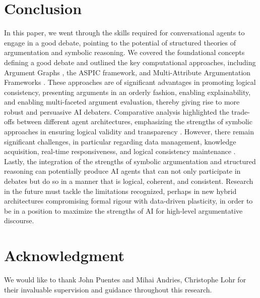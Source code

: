 \documentclass[conference]{IEEEtran}
\begin{document}
\section{Conclusion}
In this paper, we went through the skills required for conversational agents to engage in a good debate, pointing to the potential of structured theories of argumentation and symbolic reasoning. We covered the foundational concepts defining a good debate \cite{rakshit2019debbie} \cite{tan2016winning} \cite{b8} and outlined the key computational approaches, including Argument Graphs \cite{chalaguine2020persuasive}, the ASPIC framework, and Multi-Attribute Argumentation Frameworks \cite{engelmann2022argumentation}. These approaches are of significant advantages in promoting logical consistency, presenting arguments in an orderly fashion, enabling explainability, and enabling multi-faceted argument evaluation, thereby giving rise to more robust and persuasive AI debaters.
Comparative analysis highlighted the trade-offs between different agent architectures, emphasizing the strengths of symbolic approaches in ensuring logical validity and transparency \cite{b11}. However, there remain significant challenges, in particular regarding data management, knowledge acquisition, real-time responsiveness, and logical consistency maintenance \cite{b10} \cite{b11}.
Lastly, the integration of the strengths of symbolic argumentation and structured reasoning can potentially produce AI agents that can not only participate in debates but do so in a manner that is logical, coherent, and consistent. Research in the future must tackle the limitations recognized, perhaps in new hybrid architectures compromising formal rigour with data-driven plasticity, in order to be in a position to maximize the strengths of AI for high-level argumentative discourse.

\section*{Acknowledgment}
We would like to thank John Puentes and Mihai Andries, Christophe Lohr for their invaluable supervision and guidance throughout this research.


\printbibliography
\end{document}
